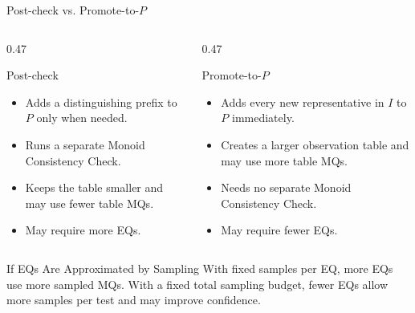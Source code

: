 \documentclass{beamer}
\begin{document}
\begin{frame}{Post-check vs. Promote-to-$P$}
    \footnotesize
    \begin{columns}[T,onlytextwidth]
        \begin{column}{0.47\textwidth}
            \begin{block}{Post-check}
                \begin{itemize}
                    \item Adds a distinguishing prefix to $P$ only when needed.
                    \item Runs a separate Monoid Consistency Check.
                    \item Keeps the table smaller and may use fewer table MQs.
                    \item May require more EQs.
                \end{itemize}
            \end{block}
        \end{column}
        \begin{column}{0.47\textwidth}
            \begin{block}{Promote-to-$P$}
                \begin{itemize}
                    \item Adds every new representative in $I$ to $P$ immediately.
                    \item Creates a larger observation table and may use more table MQs.
                    \item Needs no separate Monoid Consistency Check.
                    \item May require fewer EQs.
                \end{itemize}
            \end{block}
        \end{column}
    \end{columns}

    \vspace{0.4em}
    \begin{alertblock}{If EQs Are Approximated by Sampling}
        With fixed samples per EQ, more EQs use more sampled MQs.
        With a fixed total sampling budget, fewer EQs allow more samples
        per test and may improve confidence.
    \end{alertblock}
\end{frame}
\end{document}
